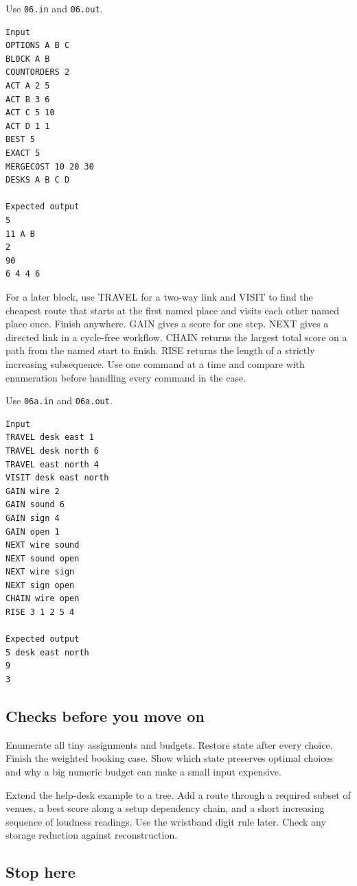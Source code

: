 \documentclass[11pt,letterpaper]{article}
\begin{document}
Use \texttt{06.in} and \texttt{06.out}.

\begin{samepage}
\small
\begin{verbatim}
Input
OPTIONS A B C
BLOCK A B
COUNTORDERS 2
ACT A 2 5
ACT B 3 6
ACT C 5 10
ACT D 1 1
BEST 5
EXACT 5
MERGECOST 10 20 30
DESKS A B C D

Expected output
5
11 A B
2
90
6 4 4 6
\end{verbatim}
\end{samepage}

For a later block, use TRAVEL for a two-way link and VISIT to find the cheapest route that starts at the first named place and visits each other named place once. Finish anywhere. GAIN gives a score for one step. NEXT gives a directed link in a cycle-free workflow. CHAIN returns the largest total score on a path from the named start to finish. RISE returns the length of a strictly increasing subsequence. Use one command at a time and compare with enumeration before handling every command in the case.

Use \texttt{06a.in} and \texttt{06a.out}.

\begin{samepage}
\small
\begin{verbatim}
Input
TRAVEL desk east 1
TRAVEL desk north 6
TRAVEL east north 4
VISIT desk east north
GAIN wire 2
GAIN sound 6
GAIN sign 4
GAIN open 1
NEXT wire sound
NEXT sound open
NEXT wire sign
NEXT sign open
CHAIN wire open
RISE 3 1 2 5 4

Expected output
5 desk east north
9
3
\end{verbatim}
\end{samepage}

\subsection*{Checks before you move on}

Enumerate all tiny assignments and budgets. Restore state after every choice. Finish the weighted booking case. Show which state preserves optimal choices and why a big numeric budget can make a small input expensive.

Extend the help-desk example to a tree. Add a route through a required subset of venues, a best score along a setup dependency chain, and a short increasing sequence of loudness readings. Use the wristband digit rule later. Check any storage reduction against reconstruction.

\subsection*{Stop here}
\end{document}
